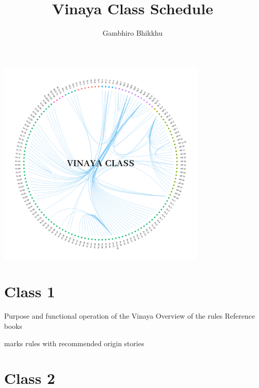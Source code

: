 \documentclass[11pt,oneside]{memoir}
\title{Vinaya Class Schedule}
\author{Gambhiro Bhikkhu}
\begin{document}
\thispagestyle{empty}

\vspace*{-10mm}
{\centering
  \includegraphics[width=100mm]{../../assets/vinaya-class-title/vinaya-class-title-300dpi.png}
\par}

\bigskip

\chapter{Class 1}

\centeringsectiontrue

{\centering
{}

 Purpose and functional operation of the Vinaya\quad
{} Overview of the rules\quad
{} Reference books

\orig{} marks rules with recommended origin stories
\par}

\centeringsectionfalse
\numberedtopicstrue

\chapter{Class 2}
\end{document}
